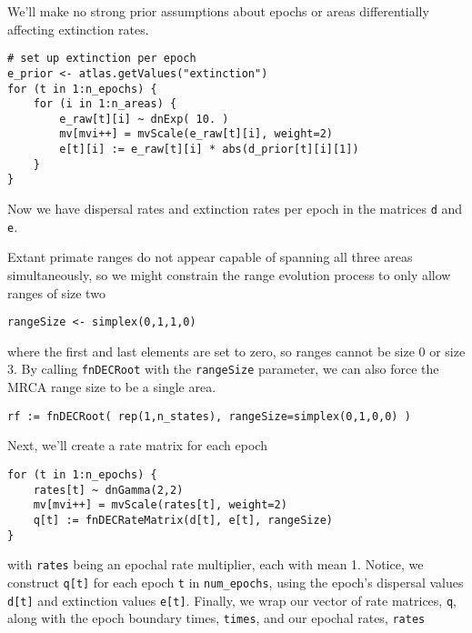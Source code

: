 We'll make no strong prior assumptions about epochs or areas differentially affecting extinction rates.

\begin{snugshade}
\begin{lstlisting}
# set up extinction per epoch
e_prior <- atlas.getValues("extinction")
for (t in 1:n_epochs) {
	for (i in 1:n_areas) {
		e_raw[t][i] ~ dnExp( 10. )
		mv[mvi++] = mvScale(e_raw[t][i], weight=2)
		e[t][i] := e_raw[t][i] * abs(d_prior[t][i][1])
	}
}
\end{lstlisting}
\end{snugshade}

Now we have dispersal rates and extinction rates per epoch in the matrices {\tt d} and {\tt e}.

Extant primate ranges do not appear capable of spanning all three areas simultaneously, so we might constrain the range evolution process to only allow ranges of size two

\begin{snugshade}
\begin{lstlisting}
rangeSize <- simplex(0,1,1,0)
\end{lstlisting}
\end{snugshade}

where the first and last elements are set to zero, so ranges cannot be size 0 or size 3.
By calling {\tt fnDECRoot} with the {\tt rangeSize} parameter, we can also force the MRCA range size to be a single area.

\begin{snugshade}
\begin{lstlisting}
rf := fnDECRoot( rep(1,n_states), rangeSize=simplex(0,1,0,0) )
\end{lstlisting}
\end{snugshade}

Next, we'll create a rate matrix for each epoch

\begin{snugshade}
\begin{lstlisting}
for (t in 1:n_epochs) {
	rates[t] ~ dnGamma(2,2)
	mv[mvi++] = mvScale(rates[t], weight=2)	
	q[t] := fnDECRateMatrix(d[t], e[t], rangeSize)
}
\end{lstlisting}
\end{snugshade}

with {\tt rates} being an epochal rate multiplier, each with mean 1.
Notice, we construct {\tt q[t]} for each epoch {\tt t} in {\tt num\_epochs}, using the epoch's dispersal values {\tt d[t]} and extinction values {\tt e[t]}.
Finally, we wrap our vector of rate matrices, {\tt q}, along with the epoch boundary times, {\tt times}, and  our epochal rates, {\tt rates} 

